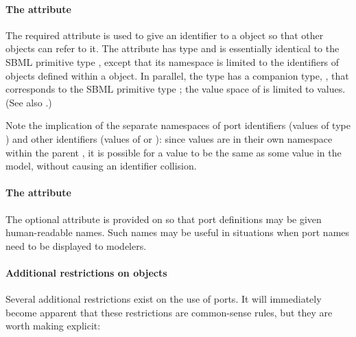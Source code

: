 \paragraph{The \fixttspace{} attribute}

The required attribute  is used to give an identifier to a
\Port object so that other objects can refer to it.  The attribute has
type  and is essentially identical to the SBML
primitive type , except that its namespace is limited to
the identifiers of \Port objects defined within a \Model object.  In
parallel, the  type has a companion type,
, that corresponds to the SBML primitive type
; the value space of  is limited
to  values.  (See also .)

Note the implication of the separate namespaces of port identifiers
(values of type ) and other identifiers (values of
 or ): since  values
are in their own namespace within the parent \Model, it is possible for
a  value to be the same as some  value
in the model, without causing an identifier collision.


\paragraph{The \fixttspace{} attribute}

The optional  attribute is provided on \Port so that port
definitions may be given human-readable names.  Such names may be useful
in situations when port names need to be displayed to modelers.


\paragraph{Additional restrictions on  objects}

Several additional restrictions exist on the use of ports.  It will
immediately become apparent that these restrictions are common-sense
rules, but they are worth making explicit:


